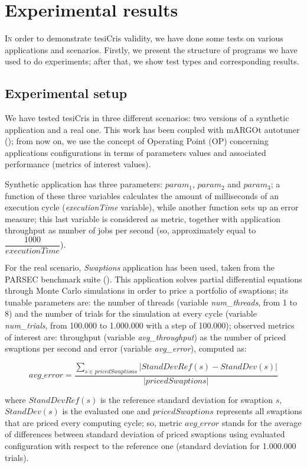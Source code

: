 \chapter{Experimental results}\label{exps}

\lettrine{I}{n} order to demonstrate tesiCris validity, we have done some tests on various applications and scenarios. Firstly, we present the structure of programs we have used to do experiments; after that, we show test types and corresponding results.

\section{Experimental setup}\label{expSetup}

We have tested tesiCris in three different scenarios: two versions of a synthetic application and a real one. This work has been coupled with mARGOt autotuner (\cite{gadioli2015application}); from now on, we use the concept of Operating Point (OP) concerning applications configurations in terms of parameters values and associated performance (metrics of interest values).

Synthetic application has three parameters: $param_1$, $param_2$ and $param_3$; a function of these three variables calculates the amount of milliseconds of an execution cycle (\textit{executionTime} variable), while another function sets up an error measure; this last variable is considered as metric, together with application throughput as number of jobs per second (so, approximately equal to $\dfrac{1000}{\textit{executionTime}}$).

For the real scenario, \textit{Swaptions} application has been used, taken from the PARSEC benchmark suite (\cite{bienia2008parsec}). This application solves partial differential equations through Monte Carlo simulations in order to price a portfolio of swaptions; its tunable parameters are: the number of threads (variable \textit{num\_threads}, from 1 to 8) and the number of trials for the simulation at every cycle (variable \textit{num\_trials}, from 100.000 to 1.000.000 with a step of 100.000); observed metrics of interest are: throughput (variable \textit{avg\_throughput}) as the number of priced swaptions per second and error (variable \textit{avg\_error}), computed as:

\[
avg\_error = \dfrac{\sum_{s \in pricedSwaptions} \left\vert StandDevRef(s) - StandDev(s) \right\vert}{\left\vert pricedSwaptions \right\vert}
\]

where $StandDevRef(s)$ is the reference standard deviation for swaption $s$, $StandDev(s)$ is the evaluated one and $pricedSwaptions$ represents all swaptions that are priced every computing cycle; so, metric $avg\_error$ stands for the average of differences between standard deviation of priced swaptions using evaluated configuration with respect to the reference one (standard deviation for 1.000.000 trials).

